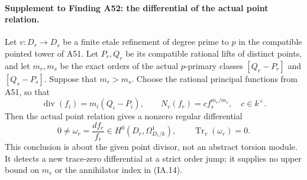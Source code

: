 \paragraph{Supplement to Finding A52: the differential of the actual point relation.}
Let $v:D_r\to D_s$ be a finite etale refinement of degree prime
to $p$ in the compatible pointed tower of A51. Let $P_r,Q_r$
be its compatible rational lifts of distinct points, and let
$m_r,m_s$ be the exact orders of the actual $p$-primary classes
$[Q_r-P_r]$ and $[Q_s-P_s]$. Suppose that $m_r>m_s$.
Choose the rational principal functions from A51, so that
\[
 \operatorname{div}(f_i)=m_i(Q_i-P_i),\qquad
 N_v(f_r)=c f_s^{m_r/m_s},\quad c\in k^\times.
\tag{PD.1}
\]
Then the actual point relation gives a nonzero regular differential
\[
 0\ne\omega_r=\frac{df_r}{f_r}
       \in H^0(D_r,\Omega^1_{D_r/k}),\qquad
                         \operatorname{Tr}_v(\omega_r)=0.
\tag{PD.2}
\]
This conclusion is about the given point divisor, not an abstract
torsion module. It detects a new trace-zero differential at a
strict order jump; it supplies no upper bound on $m_r$ or the
annihilator index in (IA.14).

